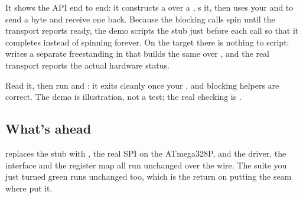 It shows the API end to end: it constructs a  over a ,
s it, then uses your  and  to send a byte and
receive one back. Because the blocking calls spin until the transport reports ready, the demo
scripts the stub just before each call so that it completes instead of spinning forever. On the
target there is nothing to script:  writes a separate freestanding  in
 that builds the same  over , and the real transport reports
the actual hardware status.

Read it, then run  and : it exits cleanly once your
,  and blocking helpers are correct. The demo is illustration, not a test; the
real checking is .

\subsection*{What's ahead}
 replaces the stub with , the real SPI on the ATmega328P, and the driver, the
interface and the register map all run unchanged over the wire. The suite you just turned green runs
unchanged too, which is the return on putting the seam where  put it.
